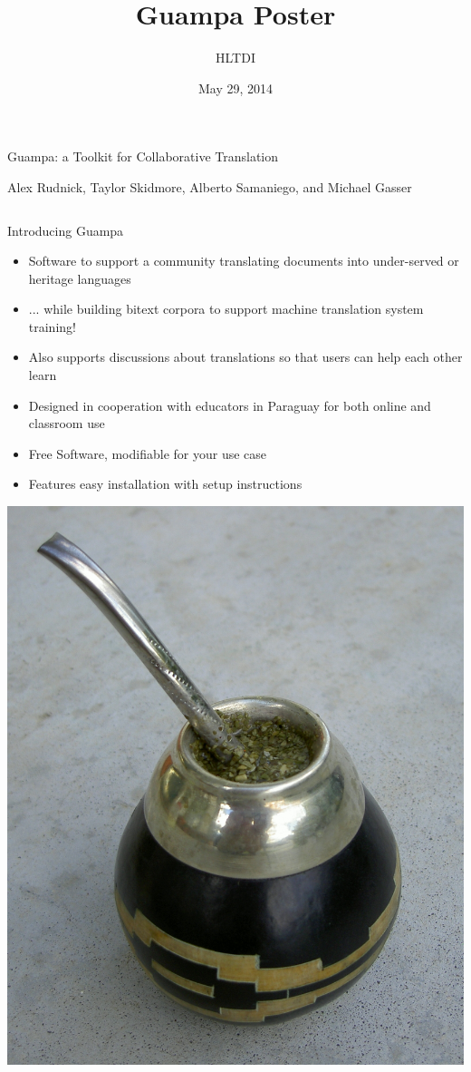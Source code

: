 \documentclass[final]{beamer}
\title{Guampa Poster}
\author{HLTDI}
\institute[Indiana University]{School of Informatics and Computing, Indiana University}
\date{May 29, 2014}
\begin{document}
\begin{frame}{} 
  \begin{block}
    {\centering \Huge Guampa: a Toolkit for Collaborative Translation}\par
    \centering
    {\large Alex Rudnick, Taylor Skidmore, Alberto Samaniego, and Michael Gasser}
    \par
  \end{block}

\begin{columns}[t]

  \begin{column}{.32\linewidth}

  \vfill
  \begin{block}{\large Introducing Guampa}
    \centering
    \begin{itemize}
    \item Software to support a community translating documents into
    under-served or heritage languages
    \item ... while building bitext corpora to support machine translation
    system training!
    \item Also supports discussions about translations so that users can help
    each other learn
    \item Designed in cooperation with educators in Paraguay for both online
    and classroom use
    \item Free Software, modifiable for your use case
    \item Features easy installation with setup instructions
    \end{itemize}
  \end{block}

  \centering
  \includegraphics[width=.3\linewidth]{guampa_mate.jpg}


\end{column}
\end{columns}
\end{frame}
\end{document}
